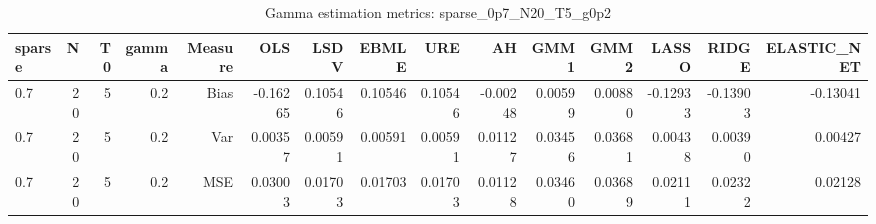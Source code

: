 \begin{table}[!htbp]\centering
\caption{Gamma estimation metrics: sparse_0p7_N20_T5_g0p2}
\label{tab:table1_sparse_0p7_N20_T5_g0p2}
\begin{tabular}{lrrrrrrrrrrrrrr}
\hline
sparse & N & T0 & gamma & Measure & OLS & LSDV & EBMLE & URE & AH & GMM1 & GMM2 & LASSO & RIDGE & ELASTIC_NET \\
\hline
0.7 & 20 & 5 & 0.2 & Bias & -0.16265 & 0.10546 & 0.10546 & 0.10546 & -0.00248 & 0.00599 & 0.00880 & -0.12933 & -0.13903 & -0.13041 \\
0.7 & 20 & 5 & 0.2 & Var & 0.00357 & 0.00591 & 0.00591 & 0.00591 & 0.01127 & 0.03456 & 0.03681 & 0.00438 & 0.00390 & 0.00427 \\
0.7 & 20 & 5 & 0.2 & MSE & 0.03003 & 0.01703 & 0.01703 & 0.01703 & 0.01128 & 0.03460 & 0.03689 & 0.02111 & 0.02322 & 0.02128 \\
\hline
\end{tabular}
\end{table}

